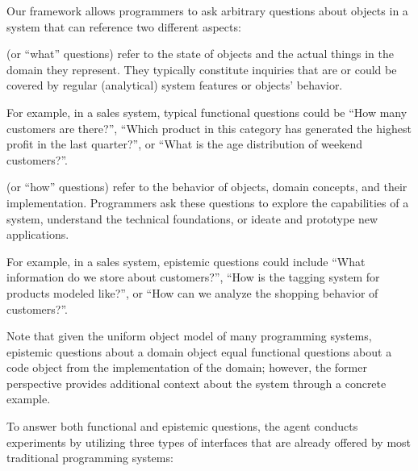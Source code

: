 Our framework allows programmers to ask arbitrary questions about objects in a system that can reference two different aspects:

\begin{description}[noextralabelsep]
	\item[Functional questions] (or ``what'' questions) refer to the state of objects and the actual things in the domain they represent.
	They typically constitute inquiries that are or could be covered by regular (analytical) system features or objects' behavior.

	For example, in a sales system, typical functional questions could be ``How many customers are there?'', ``Which product in this category has generated the highest profit in the last quarter?'', or ``What is the age distribution of weekend customers?''.

	\item[Epistemic questions] (or ``how'' questions) refer to the behavior of objects, domain concepts, and their implementation.
	Programmers ask these questions to explore the capabilities of a system, understand the technical foundations, or ideate and prototype new applications.

	For example, in a sales system, epistemic questions could include ``What information do we store about customers?'', ``How is the tagging system for products modeled like?'', or ``How can we analyze the shopping behavior of customers?''.

	Note that given the uniform object model of many programming systems, epistemic questions about a domain object equal functional questions about a code object from the implementation of the domain; however, the former perspective provides additional context about the system through a concrete example.
\end{description}

To answer both functional and epistemic questions, the agent conducts experiments by utilizing three types of interfaces that are already offered by most traditional programming systems:

